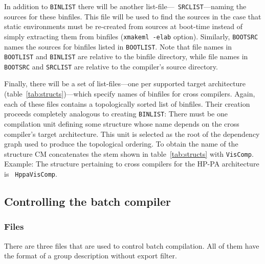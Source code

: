 \documentclass{article}
\begin{document}
In addition to {\tt BINLIST} there will be another list-file---{\tt
SRCLIST}---naming the sources for these binfiles.  This file will be
used to find the sources in the case that static environments must be
re-created from sources at boot-time instead of simply extracting them
from binfiles ({\tt xmakeml -elab} option).  Similarly, {\tt BOOTSRC}
names the sources for binfiles listed in {\tt BOOTLIST}. Note that
file names in {\tt BOOTLIST} and {\tt BINLIST} are relative to the
binfile directory, while file names in {\tt BOOTSRC} and {\tt SRCLIST}
are relative to the compiler's source directory.

Finally, there will be a set of list-files---one per supported target
architecture (table~\ref{tab:structs})---which specify names of
binfiles for cross compilers.  Again, each of these files contains a
topologically sorted list of binfiles.  Their creation proceeds
completely analogous to creating {\tt BINLIST}: There must be one
compilation unit defining some structure whose name depends on the
cross compiler's target architecture.  This unit is selected as the
root of the dependency graph used to produce the topological ordering.
To obtain the name of the structure CM concatenates the stem shown in
table~\ref{tab:structs} with {\tt VisComp}.  Example:  The structure
pertaining to cross compilers for the HP-PA architecture is {\tt
HppaVisComp}.

\subsection{Controlling the batch compiler}

\subsubsection{Files}

There are three files that are used to control batch compilation.  All
of them have the format of a group description without export filter.
\end{document}
